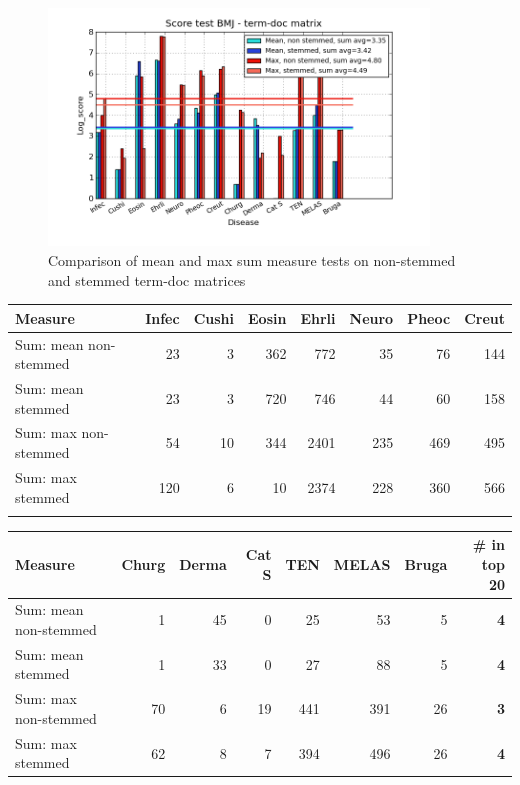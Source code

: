 \begin{figure}[H]
        \begin{center}
          \includegraphics[width=0.9\textwidth]{barcharts/termDoc_bmj_hist_3000_ns_s_mea_max_sum.png}
        \end{center}
        \caption{Comparison of mean and max sum measure tests on non-stemmed and stemmed term-doc matrices}
        \label{termDoc_bmj_hist_3000_ns_s_mea_max_sum}
\end{figure} 

\begin{table}[H]
  \begin{tiny}
  \label{testResult}
  \begin{tabular}{|l|r|r|r|r|r|r|r|}
    \hline
    Measure &Infec&Cushi&Eosin&Ehrli&Neuro&Pheoc&Creut \\
    \hline
    Sum: mean non-stemmed &23&3&362&772&35&76&144 \\
    \hline
    Sum: mean stemmed &23&3&720&746&44&60&158 \\
    \hline
    Sum: max non-stemmed &54&10&344&2401&235&469&495 \\
    \hline
    Sum: max stemmed &120&6&10&2374&228&360&566 \\
    \hline
  \multicolumn{8}{c}{} \\
  \end{tabular}
  \begin{tabular}{|l|r|r|r|r|r|r|r|}
    \hline
    Measure &Churg&Derma&Cat S&TEN&MELAS&Bruga& \scriptsize{\textbf{\# in top 20}} \\
    \hline
    Sum: mean non-stemmed &1&45&0&25&53&5 &\scriptsize{\textbf{4}} \\
    \hline
    Sum: mean stemmed &1&33&0&27&88&5 &\scriptsize{\textbf{4}}\\
    \hline
    Sum: max non-stemmed &70&6&19&441&391&26 & \scriptsize{\textbf{3}} \\
    \hline
    Sum: max stemmed &62&8&7&394&496&26 & \scriptsize{\textbf{4}} \\
    \hline
  \end{tabular}
  \end{tiny}
\end{table}

